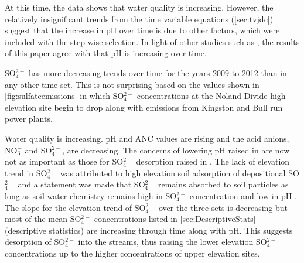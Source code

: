 At this time, the data shows that water quality is increasing.
However, the relatively insignificant trends from the time variable equations (\autoref{sec:tvjdc}) suggest that the increase in pH over time is due to other factors, which were included with the step-wise selection. 
In light of other studies such as \citet{robinson2008ph}, the results of this paper agree with \citet{cai2013} that pH is increasing over time.

SO$_4^{2-}$ has more decreasing trends over time for the years 2009 to 2012 than in any other time set.
This is not surprising based on the values shown in \autoref{fig:sulfateemissions} in which SO$_4^{2-}$ concentrations at the Noland Divide high elevation site begin to drop along with emissions from Kingston and Bull run power plants.  

Water quality is increasing.  
pH and ANC values are rising and the acid anions, NO$_3^-$ and SO$_4^{2-}$, are decreasing.  
The concerns of lowering pH raised in \citet{robinson2008ph} are now not as important as those for SO$_4^{2-}$ desorption raised in \citet{cai2013}.  
The lack of elevation trend in SO$_4^{2-}$ was attributed to high elevation soil adsorption of depositional SO$_4^{2-}$ and a statement was made that SO$_4^{2-}$ remains absorbed to soil particles as long as soil water chemistry remains high in SO$_4^{2-}$ concentration and low in pH \citep{cai2011long}.  
The slope for the elevation trend of SO$_4^{2-}$ over the three sets is decreasing but most of the mean SO$_4^{2-}$ concentrations listed in \autoref{sec:DescriptiveStats} (descriptive statistics) are increasing through time along with pH.
This suggests desorption of SO$_4^{2-}$ into the streams, thus raising the lower elevation SO$_4^{2-}$ concentrations up to the higher concentrations of upper elevation sites.


  
